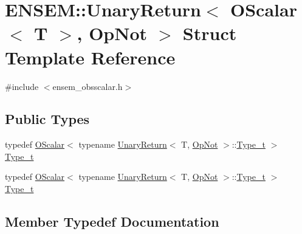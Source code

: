\hypertarget{structENSEM_1_1UnaryReturn_3_01OScalar_3_01T_01_4_00_01OpNot_01_4}{}\section{E\+N\+S\+EM\+:\+:Unary\+Return$<$ O\+Scalar$<$ T $>$, Op\+Not $>$ Struct Template Reference}
\label{structENSEM_1_1UnaryReturn_3_01OScalar_3_01T_01_4_00_01OpNot_01_4}


{\ttfamily \#include $<$ensem\+\_\+obsscalar.\+h$>$}

\subsection*{Public Types}
\begin{DoxyCompactItemize}
\item 
typedef \mbox{\hyperlink{classENSEM_1_1OScalar}{O\+Scalar}}$<$ typename \mbox{\hyperlink{structENSEM_1_1UnaryReturn}{Unary\+Return}}$<$ T, \mbox{\hyperlink{structENSEM_1_1OpNot}{Op\+Not}} $>$\+::\mbox{\hyperlink{structENSEM_1_1UnaryReturn_3_01OScalar_3_01T_01_4_00_01OpNot_01_4_a0a3874d32de1d033bfe55bfd921d73be}{Type\+\_\+t}} $>$ \mbox{\hyperlink{structENSEM_1_1UnaryReturn_3_01OScalar_3_01T_01_4_00_01OpNot_01_4_a0a3874d32de1d033bfe55bfd921d73be}{Type\+\_\+t}}
\item 
typedef \mbox{\hyperlink{classENSEM_1_1OScalar}{O\+Scalar}}$<$ typename \mbox{\hyperlink{structENSEM_1_1UnaryReturn}{Unary\+Return}}$<$ T, \mbox{\hyperlink{structENSEM_1_1OpNot}{Op\+Not}} $>$\+::\mbox{\hyperlink{structENSEM_1_1UnaryReturn_3_01OScalar_3_01T_01_4_00_01OpNot_01_4_a0a3874d32de1d033bfe55bfd921d73be}{Type\+\_\+t}} $>$ \mbox{\hyperlink{structENSEM_1_1UnaryReturn_3_01OScalar_3_01T_01_4_00_01OpNot_01_4_a0a3874d32de1d033bfe55bfd921d73be}{Type\+\_\+t}}
\end{DoxyCompactItemize}


\subsection{Member Typedef Documentation}
\mbox{\label{structENSEM_1_1UnaryReturn_3_01OScalar_3_01T_01_4_00_01OpNot_01_4_a0a3874d32de1d033bfe55bfd921d73be}} 

